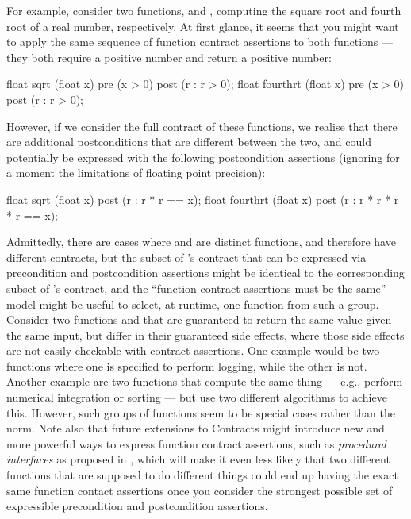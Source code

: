 For example, consider two functions,  and , computing the square root and fourth root of a real number, respectively. At first glance, it seems that you might want to apply the same sequence of function contract assertions to both functions --- they both require a positive number and return a positive number:
\begin{codeblock}
float sqrt (float x)     pre (x > 0) post (r : r > 0);
float fourthrt (float x) pre (x > 0) post (r : r > 0);
\end{codeblock}
However, if we consider the full contract of these functions, we realise that there are additional postconditions that are different between the two, and could potentially be expressed with the following postcondition assertions (ignoring for a moment the limitations of floating point precision):
\begin{codeblock}
float sqrt (float x) post (r : r * r == x);
float fourthrt (float x) post (r : r * r * r * r == x);
\end{codeblock}
Admittedly, there are cases where  and  are distinct functions, and therefore have different contracts, but the subset of 's contract that can be expressed via precondition and postcondition assertions might be identical to the corresponding subset of 's contract, and the ``function contract assertions must be the same'' model might be useful to select, at runtime, one function from such a group. Consider two functions  and  that are guaranteed to return the same value given the same input, but differ in their guaranteed side effects, where those side effects are not easily checkable with contract assertions. One example would be two functions where one is specified to perform logging, while the other is not. Another example are two functions that compute the same thing --- e.g., perform numerical integration or sorting --- but use two different algorithms to achieve this. However, such groups of functions seem to be special cases rather than the norm. Note also that future extensions to Contracts might introduce new and more powerful ways to express function contract assertions, such as \emph{procedural interfaces} as proposed in \cite{P0465R0}, which will make it even less likely that two different functions that are supposed to do different things could end up having the exact same function contact assertions once you consider the strongest possible set of expressible precondition and postcondition assertions.

